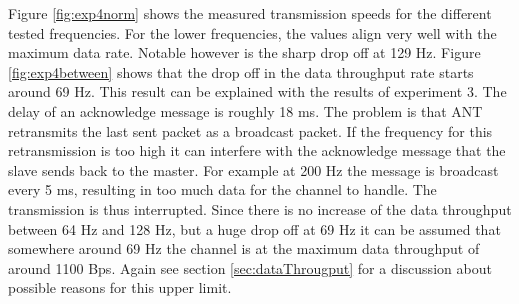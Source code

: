 \begin{description}
	Figure \ref{fig:exp4norm} shows the measured transmission speeds for the different tested frequencies. For the lower frequencies, the values align very well with the maximum data rate. Notable however is the sharp drop off at 129 Hz. Figure \ref{fig:exp4between} shows
	that the drop off in the data throughput rate starts around 69 Hz. This result can be explained with the results of experiment 3. The delay of an acknowledge message is roughly 18 ms. The problem is that ANT retransmits the last sent packet as a broadcast packet. If the frequency for this retransmission is too high it can interfere with the acknowledge message that the slave sends back to the master. For example at 200 Hz the message is broadcast every 5 ms, resulting in too much data for the channel to handle. The transmission is thus interrupted. Since there is no increase of the data throughput between 64 Hz and 128 Hz, but a huge drop off at 69 Hz it can be assumed that somewhere around 69 Hz the channel is at the maximum data throughput of around 1100 Bps. Again see section \ref{sec:dataThrougput} for a discussion about possible reasons for this upper limit. 

\end{description}
\newpage

